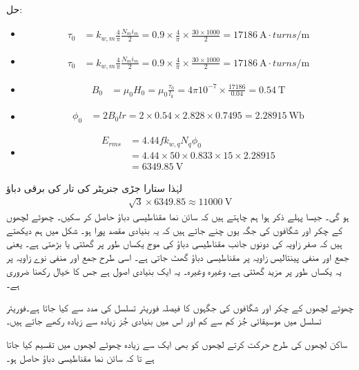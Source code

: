 حل:
\begin{itemize}
\item
\begin{align*}
\tau_0&=k_{w,m} \frac{4}{\pi}\frac{N_m i_m}{2}=0.9 \times \frac{4}{\pi} \times \frac{30 \times 1000}{2}=\SI{17186}{\ampere \cdot turns \per \meter}
\end{align*}
\item
\begin{align*}
\tau_0&=k_{w,m} \frac{4}{\pi}\frac{N_m i_m}{2}=0.9 \times \frac{4}{\pi} \times \frac{30 \times 1000}{2}=\SI{17186}{\ampere \cdot turns \per \meter}
\end{align*}
\item
\begin{align*}
B_0&=\mu_0 H_0=\mu_0 \frac{\tau_0}{l_k}=4 \pi 10^{-7} \times \frac{17186}{0.04}=\SI{0.54}{\tesla}
\end{align*}
\item
\begin{align*}
\phi_0&=2 B_0 l r =2 \times 0.54 \times 2.828 \times 0.7495=\SI{2.28915}{\weber}
\end{align*}
\item
\begin{align*}
E_{rms}&=4.44 f k_{w,q} N_q \phi_0\\
&=4.44 \times 50 \times 0.833 \times 15 \times 2.28915\\
&=\SI{6349.85}{\volt} 
\end{align*}
\end{itemize}
لہٰذا ستارا جڑی جنریٹر کی تار کی برقی دباؤ
\begin{align*}
\sqrt{3} \times 6349.85 \approx \SI{11000}{\volt}
\end{align*}
ہو گی۔
%
جیسا پہلے ذکر ہوا ہم چاہتے ہیں کہ سائن نما مقناطیسی دباؤ حاصل کر سکیں۔ چھوٹے لچھوں کے چکر اور شگافوں کی جگہ یوں چنے جاتے ہیں کہ یہ بنیادی مقصد پورا ہو۔ شکل  میں ہم دیکھتے ہیں کہ صفر زاویہ کی دونوں جانب مقناطیسی دباؤ کی موج یکساں طور پر گھٹتی یا بڑھتی ہے۔ یعنی جمع اور منفی  پینتالیس زاویہ پر مقناطیسی دباؤ    گھٹ جاتی ہے۔ اسی طرح جمع اور منفی نوے زاویہ پر یہ یکساں طور پر مزید گھٹتی ہے، وغیرہ وغیرہ۔ یہ ایک بنیادی اصول ہے جس کا خیال رکھنا ضروری ہے۔

چھوٹے لچھوں کے چکر اور شگافوں کی جگہوں کا فیصلہ فوریئر تسلسل کی مدد سے کیا جاتا ہے۔فوریئر تسلسل میں موسیقائی جُز کم سے کم اور اس میں بنیادی جُز زیادہ سے زیادہ رکھے جاتے ہیں۔

ساکن لچھوں کی طرح حرکت کرتے لچھوں کو بھی ایک سے زیادہ چھوٹے لچھوں میں تقسیم کیا جاتا ہے تا کہ سائن نما مقناطیسی دباؤ حاصل ہو۔


